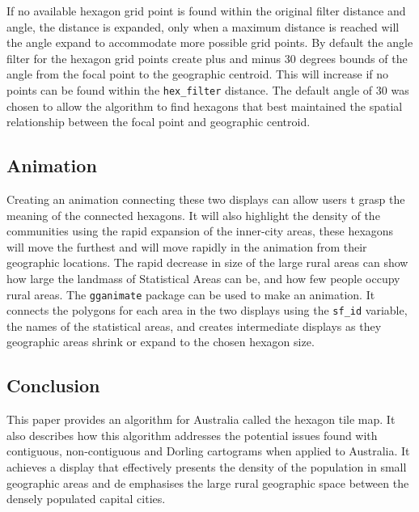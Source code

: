If no available hexagon grid point is found within the original filter
distance and angle, the distance is expanded, only when a maximum
distance is reached will the angle expand to accommodate more possible
grid points. By default the angle filter for the hexagon grid points
create plus and minus 30 degrees bounds of the angle from the focal
point to the geographic centroid. This will increase if no points can be
found within the \texttt{hex\_filter} distance. The default angle of 30
was chosen to allow the algorithm to find hexagons that best maintained
the spatial relationship between the focal point and geographic
centroid.

\hypertarget{animation}{%
\subsection{Animation}\label{animation}}

Creating an animation connecting these two displays can allow users t
grasp the meaning of the connected hexagons. It will also highlight the
density of the communities using the rapid expansion of the inner-city
areas, these hexagons will move the furthest and will move rapidly in
the animation from their geographic locations. The rapid decrease in
size of the large rural areas can show how large the landmass of
Statistical Areas can be, and how few people occupy rural areas. The
\texttt{gganimate} \citep{gganimate} package can be used to make an
animation. It connects the polygons for each area in the two displays
using the \texttt{sf\_id} variable, the names of the statistical areas,
and creates intermediate displays as they geographic areas shrink or
expand to the chosen hexagon size.

\hypertarget{conclusion-03}{%
\subsection{Conclusion}\label{conclusion-03}}

This paper provides an algorithm for Australia called the hexagon tile
map. It also describes how this algorithm addresses the potential issues
found with contiguous, non-contiguous and Dorling cartograms when
applied to Australia. It achieves a display that effectively presents
the density of the population in small geographic areas and de
emphasises the large rural geographic space between the densely
populated capital cities.


